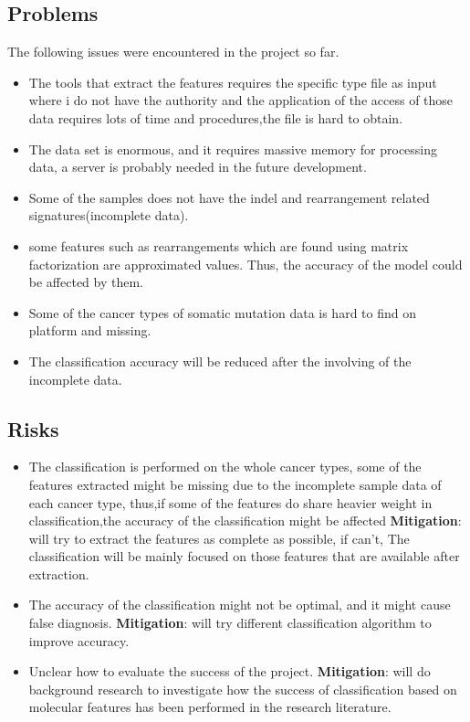 \documentclass[11pt]{article}
\begin{document}
\subsection{Problems}\label{problems}

The following issues were encountered in the project so far.
\begin{itemize}
 

\item The tools that extract the features requires the specific type file as input where i do not have the authority and the application of the access of those data requires lots of time and procedures,the file is hard to obtain.
\item The data set is enormous, and it requires massive memory for processing data, a server is probably needed in the future development.
\item Some of the samples does not have the indel and rearrangement related signatures(incomplete data).
\item some features such as rearrangements which are found using matrix factorization are approximated values. Thus, the accuracy of the model could be affected by them.
\item Some of the cancer types of somatic mutation data is hard to find on platform and missing.
\item The classification accuracy will be reduced after the involving of the incomplete data.

\end{itemize}

\subsection{Risks}\label{risks}

\begin{itemize}
\item The classification is performed on the whole cancer types, some of the features extracted might be missing due to the incomplete sample data of each cancer type, thus,if some of the features do share heavier weight in classification,the accuracy of the classification might be affected \textbf{Mitigation}: will try to extract the features as complete as possible, if can't, The classification will be mainly focused on those features that are available after extraction.
\item The accuracy of the classification might not be optimal, and it might cause false diagnosis. \textbf{Mitigation}: will try different classification algorithm to improve accuracy.
\item Unclear how to evaluate the success of the project. \textbf{Mitigation}: will do
background research to investigate how the success of classification based on molecular features has
been performed in the research literature.
\end{itemize}
    
\end{document}
